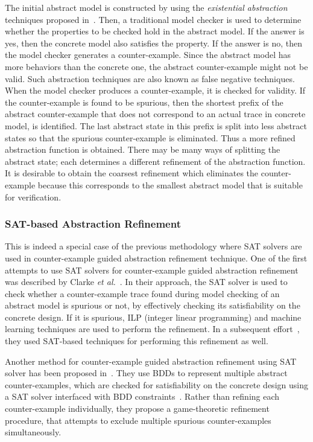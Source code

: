 \noindent
The initial abstract model is constructed by using the {\em existential 
abstraction} techniques proposed in~\cite{clarke:00b}.
Then, a traditional model checker is used to determine whether the 
properties to be checked hold in the abstract model. If the answer is yes,
then the concrete model also satisfies the property. If the answer is no, 
then the model checker generates a counter-example. Since the abstract model 
has more behaviors than the concrete one, the abstract counter-example might 
not be valid. Such abstraction techniques are also known as false negative
techniques. When the model checker produces a counter-example, it is checked 
for validity. If the counter-example is found to be spurious, then the 
shortest prefix of the abstract counter-example that does not correspond 
to an actual trace in concrete model, is identified. The last abstract 
state in this prefix is split into less abstract states so that the spurious 
counter-example is eliminated. Thus a more refined abstraction function is 
obtained. There may be many ways of splitting the abstract state; each 
determines a different refinement of the abstraction function. It is desirable 
to obtain the coarsest refinement which eliminates the counter-example because 
this corresponds to the smallest abstract model that is suitable for 
verification.

\subsubsection{SAT-based Abstraction Refinement}
This is indeed a special case of the previous methodology where SAT solvers 
are used in counter-example guided abstraction refinement technique. One of 
the first attempts to use SAT solvers for counter-example guided abstraction 
refinement was described by Clarke {\em et al.}~\cite{clarke:02}. In their 
approach, the SAT solver is used to check whether a counter-example trace 
found during model checking of an abstract model is spurious or not, by 
effectively checking its satisfiability on the concrete design. If it is 
spurious, ILP (integer linear programming) and machine learning techniques 
are used to perform the refinement. In a subsequent effort~\cite{chauhan:02}, 
they used SAT-based techniques for performing this refinement as well.

\noindent
Another method for counter-example guided abstraction refinement using 
SAT solver has been proposed in~\cite{li:03,wang:03}. They use BDDs to 
represent multiple abstract counter-examples, which are checked for 
satisfiability on the concrete design using a SAT solver interfaced with 
BDD constraints~\cite{gupta:03}. Rather than refining each counter-example 
individually, they propose a game-theoretic refinement procedure, that 
attempts to exclude multiple spurious counter-examples simultaneously.


